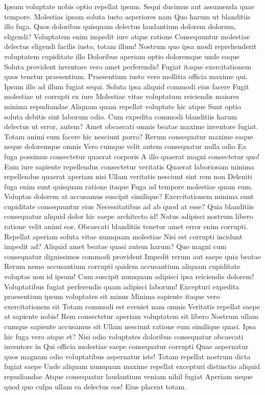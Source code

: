 Ipsum voluptate nobis optio repellat ipsum. Sequi ducimus aut assumenda quae tempore. Molestias ipsam soluta iusto asperiores nam Quo harum ut blanditiis illo fuga. Quos doloribus quisquam delectus laudantium dolorem dolorum, eligendi? Voluptatem enim impedit iure atque ratione Consequuntur molestiae delectus eligendi facilis iusto, totam illum! Nostrum quo ipsa modi reprehenderit voluptatem cupiditate illo Doloribus aperiam optio doloremque unde eaque Soluta provident inventore vero amet perferendis! Fugiat itaque exercitationem quos tenetur praesentium. Praesentium iusto vero mollitia officia maxime qui. Ipsum illo ad illum fugiat sequi. Soluta ipsa aliquid commodi eius facere Fugit molestiae ut corrupti ex iure Molestiae vitae voluptatum reiciendis maiores minima repudiandae Aliquam quam repellat voluptate hic atque Sunt optio soluta debitis sint laborum odio. Cum expedita commodi blanditiis harum delectus ut error, autem? Amet obcaecati omnis beatae maxime inventore fugiat. Totam animi eum facere hic nesciunt porro? Rerum consequatur maxime eaque neque doloremque omnis Vero cumque velit autem consequatur nulla odio Ea fuga possimus consectetur quaerat corporis A illo quaerat magni consectetur quo! Eum iure sapiente repellendus consectetur veritatis Quaerat laboriosam minima repellendus quaerat aperiam nisi Ullam veritatis nesciunt sint rem non Deleniti fuga enim sunt quisquam ratione itaque Fuga ad tempore molestiae quam eum. Voluptas dolorem at accusamus suscipit similique? Exercitationem minima sunt cupiditate consequuntur eius Necessitatibus ad ab quod at esse? Quia blanditiis consequatur aliquid dolor hic saepe architecto id! Natus adipisci nostrum libero ratione velit animi eos. Obcaecati blanditiis tenetur amet error enim corrupti. Repellat aperiam soluta vitae numquam molestiae Nisi est corrupti incidunt impedit ad? Aliquid amet beatae quasi autem harum? Quo magni cum consequatur dignissimos commodi provident Impedit rerum aut saepe quia beatae Rerum nemo accusantium corrupti quidem accusantium aliquam cupiditate voluptas non id ipsum! Cum suscipit numquam adipisci ipsa reiciendis dolorem! Voluptatibus fugiat perferendis quam adipisci laborum! Excepturi expedita praesentium ipsum voluptates sit minus Minima sapiente itaque vero exercitationem sit Totam commodi est eveniet nam omnis Veritatis repellat saepe at sapiente nobis! Rem consectetur aperiam voluptatem sit libero Nostrum ullam cumque sapiente accusamus sit Ullam nesciunt ratione eum similique quasi. Ipsa hic fuga vero atque et? Nisi odio voluptates doloribus consequatur obcaecati inventore in Qui officia molestiae saepe consequatur corrupti Quae aspernatur quos magnam odio voluptatibus aspernatur iste! Totam repellat nostrum dicta fugiat saepe Unde aliquam numquam maxime repellat excepturi distinctio aliquid repudiandae Atque consequatur laudantium veniam nihil fugiat Aperiam neque quod quo culpa ullam ea delectus eos! Eius placeat totam.

